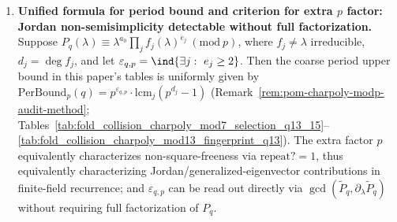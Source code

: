 \begin{enumerate}
  \item \textbf{Unified formula for period bound and criterion for extra \texorpdfstring{$p$}{p} factor: Jordan non-semisimplicity detectable without full factorization.}
  Suppose
  \(P_q(\lambda)\equiv \lambda^{a_0}\prod_j f_j(\lambda)^{e_j}\ (\mathrm{mod}\ p)\), where \(f_j\neq \lambda\) irreducible, \(d_j=\deg f_j\), and let \(\varepsilon_{q,p}=\ind\{\exists j:\ e_j\ge 2\}\).
  Then the coarse period upper bound in this paper's tables is uniformly given by
  \(
  \mathrm{PerBound}_p(q)=p^{\varepsilon_{q,p}}\cdot \mathrm{lcm}_j(p^{d_j}-1)
  \)
  (Remark~\ref{rem:pom-charpoly-modp-audit-method}; Tables~\ref{tab:fold_collision_charpoly_mod7_selection_q13_15}--\ref{tab:fold_collision_charpoly_mod13_fingerprint_q13}).
  The extra factor \(p\) equivalently characterizes non-square-freeness via \(\mathrm{repeat?}=1\), thus equivalently characterizing Jordan/generalized-eigenvector contributions in finite-field recurrence; and \(\varepsilon_{q,p}\) can be read out directly via \(\gcd(\widetilde P_q,\partial_\lambda\widetilde P_q)\) without requiring full factorization of \(P_q\).
\end{enumerate}

